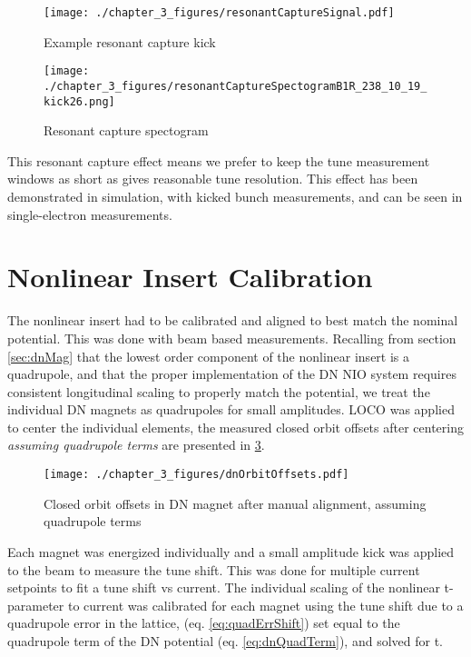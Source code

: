 \begin{figure}
	\centering
	\texttt{[image: ./chapter\_3\_figures/resonantCaptureSignal.pdf]}
	\caption{Example resonant capture kick}
	\label{fig:resCapReal}
\end{figure}


\begin{figure}
	\centering
	\texttt{[image: ./chapter\_3\_figures/resonantCaptureSpectogramB1R\_238\_10\_19\_kick26.png]}
	\caption{Resonant capture spectogram}
	\label{fig:specResCap}
\end{figure}

This resonant capture effect means we prefer to keep the tune measurement windows as short as gives reasonable tune resolution. This effect has been demonstrated in simulation, with kicked bunch measurements, and can be seen in single-electron measurements.

\section{Nonlinear Insert Calibration} \label{sec:nioCal}
The nonlinear insert had to be calibrated and aligned to best match the nominal potential. This was done with beam based measurements. Recalling from section \ref{sec:dnMag} that the lowest order component of the nonlinear insert is a quadrupole, and that the proper implementation of the DN NIO system requires consistent longitudinal scaling to properly match the potential, we treat the individual DN magnets as quadrupoles for small amplitudes. LOCO was applied to center the individual elements, the measured closed orbit offsets after centering \textit{assuming quadrupole terms} are presented in \ref{fig:dnOffset}. 

\begin{figure}
	\centering
	\texttt{[image: ./chapter\_3\_figures/dnOrbitOffsets.pdf]}
	\caption{Closed orbit offsets in DN magnet after manual alignment, assuming quadrupole terms}
	\label{fig:dnOffset}
\end{figure}


Each magnet was energized individually and a small amplitude kick was applied to the beam to measure the tune shift. This was done for multiple current setpoints to fit a tune shift vs current.
The individual scaling of the nonlinear t-parameter to current was calibrated for each magnet using the tune shift due to a quadrupole error in the lattice, (eq. \ref{eq:quadErrShift}) set equal to the quadrupole term of the DN potential (eq. \ref{eq:dnQuadTerm}), and solved for t.

